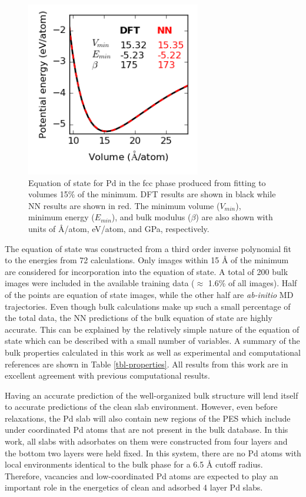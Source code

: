 \documentclass[12pt]{cmuthesis}
\begin{document}
\begin{figure}[htbp]
\centering
\includegraphics[width=3in]{./images/Pd-eos.png}
\caption{\label{fig-eos}
Equation of state for Pd in the fcc phase produced from fitting to volumes \textpm{} 15\% of the minimum. DFT results are shown in black while NN results are shown in red. The minimum volume (\(V_{min}\)), minimum energy (\(E_{min}\)), and bulk modulus (\(\beta\)) are also shown with units of \AA{}/atom, eV/atom, and GPa, respectively.}
\end{figure}

The equation of state was constructed from a third order inverse polynomial fit \cite{alchagirov-2003-reply-commen} to the energies from 72 calculations. Only images within \textpm{} 15 \AA{} of the minimum are considered for incorporation into the equation of state. A total of 200 bulk images were included in the available training data (\(\approx\) 1.6\% of all images). Half of the points are equation of state images, while the other half are \emph{ab-initio} MD trajectories. Even though bulk calculations make up such a small percentage of the total data, the NN predictions of the bulk equation of state are highly accurate. This can be explained by the relatively simple nature of the equation of state which can be described with a small number of variables. A summary of the bulk properties calculated in this work as well as experimental and computational references are shown in Table \ref{tbl-properties}. All results from this work are in excellent agreement with previous computational results.

Having an accurate prediction of the well-organized bulk structure will lend itself to accurate predictions of the clean slab environment. However, even before relaxations, the Pd slab will also contain new regions of the PES which include under coordinated Pd atoms that are not present in the bulk database. In this work, all slabs with adsorbates on them were constructed from four layers and the bottom two layers were held fixed. In this system, there are no Pd atoms with local environments identical to the bulk phase for a 6.5 \AA{} cutoff radius. Therefore, vacancies and low-coordinated Pd atoms are expected to play an important role in the energetics of clean and adsorbed 4 layer Pd slabs.
\end{document}
